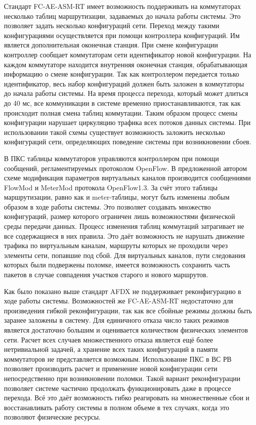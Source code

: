 \documentclass[12pt, a4paper]{article}
\begin{document}
Стандарт FC-AE-ASM-RT имеет возможность поддерживать на коммутаторах несколько таблиц маршрутизации, задаваемых до начала работы системы. Это позволяет задать несколько конфигураций сети. Переход между такими конфигурациями осуществляется при помощи контроллера конфигураций. Им является дополнительная оконечная станция. При смене конфигурации контроллер сообщает коммутаторам сети идентификатор новой конфигурации. На каждом коммутаторе находится внутренняя оконечная станция, обрабатывающая информацию о смене конфигурации. Так как контроллером передается только идентификатор, весь набор конфигураций должен быть заложен в коммутаторы до начала работы системы. На время процесса перехода, который может длиться до 40 мс, все коммуникации в системе временно приостанавливаются, так как происходит полная смена таблиц коммутации. Таким образом процесс смены конфигурации нарушает циркуляцию трафика всех потоков данных системы. При использовании такой схемы существует возможность заложить несколько конфигураций сети, определяющих поведение системы при возникновении сбоев.

В ПКС таблицы коммутаторов управляются контроллером при помощи сообщений, регламентируемых протоколом OpenFlow. В предложенной автором схеме модификация параметров виртуальных каналов производится сообщениями FlowMod и MeterMod протокола OpenFlow1.3. За счёт этого таблицы маршрутизации, равно как и meter-таблицы, могут быть изменены любым образом в ходе работы системы. Это позволяет создавать множество конфигураций, размер которого ограничен лишь возможностями физической среды передачи данных. Процесс изменения таблиц коммутаций затрагивает не все содержащиеся в них правила. Это даёт возможность не нарушать движение трафика по виртуальным каналам, маршруты которых не проходили через элементы сети, попавшие под сбой. Для виртуальных каналов, пути следования которых были подвержены поломке, имеется возможность сохранить часть пакетов в случае совпадения участков старого и нового маршрутов. 

Как было показано выше стандарт AFDX не поддерживает реконфигурацию в ходе работы системы. Возможностей же FC-AE-ASM-RT недостаточно для произведения гибкой реконфигурации, так как все сбойные режимы должны быть заранее заложены в систему. Для единичного отказа число таких режимов является достаточно большим и оценивается количеством физических элементов сети. Расчет всех случаев множественного отказа является ещё более нетривиальной задачей, а хранение всех таких конфигураций в памяти коммутаторов не представляется возможным. Использование ПКС в ВС РВ позволяет производить расчет и применение новой конфигурации сети непосредственно при возникновении поломки. Такой вариант реконфигурации позволяет системе частично продолжать функционировать даже в процессе перехода. Всё это даёт возможность гибко реагировать на множественные сбои и восстанавливать работу системы в полном объеме в тех случаях, когда это позволяют физические ресурсы.
\end{document}

